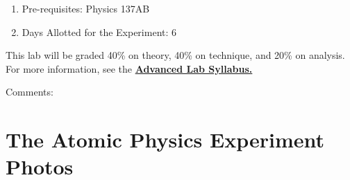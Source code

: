 \documentclass{../lab}
\begin{document}
\begin{enumerate}
    \item Pre-requisites: Physics 137AB

    \item Days Allotted for the Experiment: 6

\end{enumerate}

This lab will be graded 40\% on theory, 40\% on technique, and 20\% on analysis. For more information, see the \href{\AdvancedLabSyllabus}{\textbf{Advanced Lab Syllabus.}}

Comments: \Feedback

\pagebreak 

\section{The Atomic Physics Experiment Photos}
\end{document}
